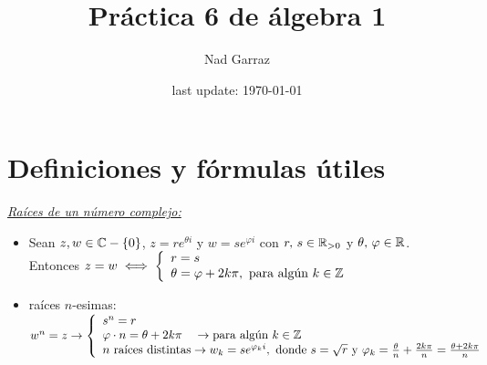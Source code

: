 \documentclass[12pt,a4paper, spanish]{article}
\begin{document}

\pagestyle{empty} %

\title{Práctica 6 de álgebra 1} %
\author{Nad Garraz} %
\date{last update: \today} %

\maketitle  %

\newpage
\section{Definiciones y fórmulas útiles}
\textit{\underline{Raíces de un número complejo: }}
\begin{itemize}
	\item Sean $z, w \en \complejos -\set{0}$, $z = re^{\theta i}$ y $w = se^{\varphi i }$ con $r,\, s \en \reales_{>0}$
	      y $\theta,\, \varphi \en \reales$.\\ Entonces $z = w \sisolosi
		      \llave{l}{
			      r = s\\
			      \theta = \varphi + 2 k\pi,\ \text{para algún } k \en \enteros
		      }$
	\item raíces $n$-esimas: $w^n = z
		      \to
		      \llave{l}{
		      s^n = r \\
		      \varphi \cdot n = \theta + 2 k \pi \quad\to \text{para algún $k\en \enteros$}\\
		      \text{$n$ raíces distintas} \to w_k=se^{\varphi_k i}, \text{ donde } s = \sqrt{r} \text{ y }
		      \varphi_k = \frac{\theta}{n} + \frac{2k\pi}{n} = \frac{\theta + 2k\pi}{n}
		      }$
\end{itemize}
\end{document}
